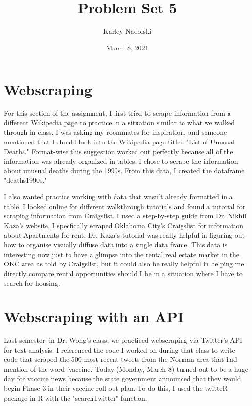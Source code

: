 \documentclass{article}
\title{Problem Set 5}
\author{Karley Nadolski}
\date{March 8, 2021}
\begin{document}
\maketitle

\section{Webscraping}
For this section of the assignment, I first tried to scrape information from a different Wikipedia page to practice in a situation similar to what we walked through in class. I was asking my roommates for inspiration, and someone mentioned that I should look into the Wikipedia page titled "List of Unusual Deaths." Format-wise this suggestion worked out perfectly because all of the information was already organized in tables. I chose to scrape the information about unusual deaths during the 1990s. From this data, I created the dataframe "deaths1990s." 

I also wanted practice working with data that wasn't already formatted in a table. I looked online for different walkthrough tutorials and found a tutorial for scraping information from Craigslist. I used a step-by-step guide from Dr. Nikhil Kaza's \href{https://nkaza.github.io/post/2020-02-04-scraping-craigslist-posts/}{website}. I specfically scraped Oklahoma City's Craigslist for information about Apartments for rent. Dr. Kaza's tutorial was really helpful in figuring out how to organize visually diffuse data into a single data frame. This data is interesting now just to have a glimpse into the rental real estate market in the OKC area as told by Craigslist, but it could also be really helpful in helping me directly compare rental opportunities should I be in a situation where I have to search for housing. 

\section{Webscraping with an API}

Last semester, in Dr. Wong's class, we practiced webscraping via Twitter's API for text analysis. I referenced the code I worked on during that class to write code that scraped the 500 most recent tweets from the Norman area that had mention of the word 'vaccine.' Today (Monday, March 8) turned out to be a huge day for vaccine news because the state government announced that they would begin Phase 3 in their vaccine roll-out plan. To do this, I used the twitteR package in R with the "searchTwitter" function. 
\end{document}
